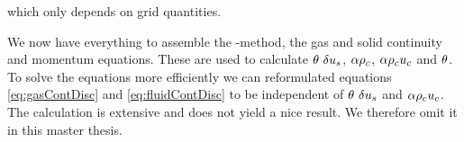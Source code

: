 which only depends on grid quantities.

We now have everything to assemble the \MP-method, the gas and solid continuity and momentum equations. 
These are used to calculate $\theta \ \delta u_s$, $\alpha \rho_c $, $\alpha \rho_c u_c$ and $\theta$.
To solve the equations more efficiently we can reformulated equations \eqref{eq:gasContDisc} and \eqref{eq:fluidContDisc} to be independent of $\theta \ \delta u_s$ and $\alpha \rho_c u_c$. 
The calculation is extensive and does not yield a nice result. We therefore omit it in this master thesis.

